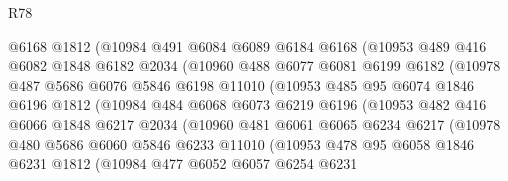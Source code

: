 \begin{lexlean}{R78}
\begin{coremodule}
                  @6168
                  @1812
                  (@10984
                    @491
                    @6084
                    @6089
                    @6184
                    @6168
                    (@10953
                      @489
                      @416
                      @6082
                      @1848
                      @6182
                      @2034
                      (@10960
                        @488
                        @6077
                        @6081
                        @6199
                        @6182
                        (@10978
                          @487
                          @5686
                          @6076
                          @5846
                          @6198
                          @11010
                          (@10953
                            @485
                            @95
                            @6074
                            @1846
                            @6196
                            @1812
                            (@10984
                              @484
                              @6068
                              @6073
                              @6219
                              @6196
                              (@10953
                                @482
                                @416
                                @6066
                                @1848
                                @6217
                                @2034
                                (@10960
                                  @481
                                  @6061
                                  @6065
                                  @6234
                                  @6217
                                  (@10978
                                    @480
                                    @5686
                                    @6060
                                    @5846
                                    @6233
                                    @11010
                                    (@10953
                                      @478
                                      @95
                                      @6058
                                      @1846
                                      @6231
                                      @1812
                                      (@10984
                                        @477
                                        @6052
                                        @6057
                                        @6254
                                        @6231

\end{coremodule}
\end{lexlean}

